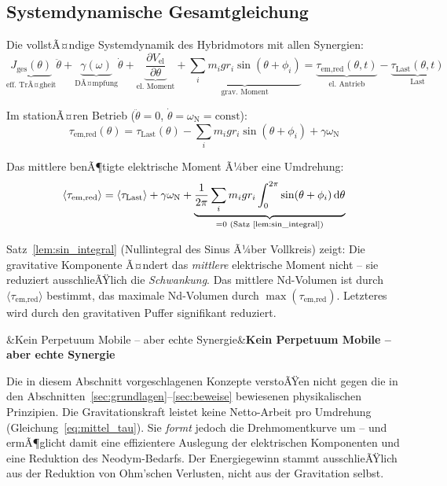 ﻿\documentclass[12pt, a4paper]{report}
\newenvironment{hinweis}[1][]{%
  \begin{hinweisframe}\sloppy%
  \ifx&#1&\else\textbf{#1}\par\smallskip\fi}{\end{hinweisframe}}
\theoremstyle{definition}
\theoremstyle{remark}
\begin{document}
\subsection{Systemdynamische Gesamtgleichung}

Die vollstÃ¤ndige Systemdynamik des Hybridmotors mit allen Synergien:
\begin{equation}
  \underbrace{J_{\text{ges}}(\theta)}_{\text{eff. TrÃ¤gheit}}
  \ddot\theta
  + \underbrace{\gamma(\omega)}_{\text{DÃ¤mpfung}} \dot\theta
  + \underbrace{\frac{\partial V_{\text{el}}}{\partial\theta}}_{\text{el.\ Moment}}
  + \underbrace{\sum_i m_i g r_i \sin(\theta+\phi_i)}_{\text{grav.\ Moment}}
  = \underbrace{\tau_{\text{em,red}}(\theta, t)}_{\text{el.\ Antrieb}}
  - \underbrace{\tau_{\text{Last}}(\theta, t)}_{\text{Last}}
  \label{eq:gesamt_dyn}
\end{equation}

Im stationÃ¤ren Betrieb ($\ddot\theta = 0$, $\dot\theta = \omega_\text{N} = \text{const}$):
\begin{equation}
  \tau_{\text{em,red}}(\theta) = \tau_{\text{Last}}(\theta)
    - \sum_i m_i g r_i \sin(\theta+\phi_i)
    + \gamma\omega_\text{N}
  \label{eq:stationaer}
\end{equation}

Das mittlere benÃ¶tigte elektrische Moment Ã¼ber eine Umdrehung:
\begin{equation}
  \langle\tau_{\text{em,red}}\rangle = \langle\tau_{\text{Last}}\rangle + \gamma\omega_\text{N}
  + \underbrace{\frac{1}{2\pi}\sum_i m_i g r_i
    \int_0^{2\pi}\sin(\theta+\phi_i)\,\dd\theta}_{= 0 \text{ (Satz~\ref{lem:sin_integral})}}
  \label{eq:mittel_tau}
\end{equation}

Satz~\ref{lem:sin_integral} (Nullintegral des Sinus Ã¼ber Vollkreis) zeigt: Die gravitative
Komponente Ã¤ndert das \emph{mittlere} elektrische Moment nicht -- sie reduziert
ausschlieÃŸlich die \emph{Schwankung}. Das mittlere Nd-Volumen ist durch
$\langle\tau_{\text{em,red}}\rangle$ bestimmt, das maximale Nd-Volumen durch
$\max(\tau_{\text{em,red}})$. Letzteres wird durch den gravitativen Puffer signifikant
reduziert.

\begin{hinweis}[Kein Perpetuum Mobile -- aber echte Synergie]
  Die in diesem Abschnitt vorgeschlagenen Konzepte verstoÃŸen nicht gegen die
  in den Abschnitten~\ref{sec:grundlagen}--\ref{sec:beweise} bewiesenen
  physikalischen Prinzipien. Die Gravitationskraft leistet keine Netto-Arbeit
  pro Umdrehung (Gleichung~\eqref{eq:mittel_tau}). Sie \emph{formt} jedoch
  die Drehmomentkurve um -- und ermÃ¶glicht damit eine effizientere Auslegung
  der elektrischen Komponenten und eine Reduktion des Neodym-Bedarfs.
  Der Energiegewinn stammt ausschlieÃŸlich aus der Reduktion von Ohm'schen
  Verlusten, nicht aus der Gravitation selbst.
\end{hinweis}
\end{document}
